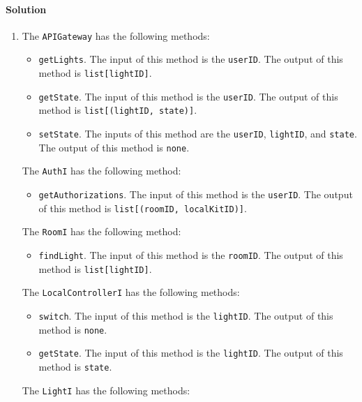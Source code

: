 \paragraph*{Solution}
\begin{enumerate}
    \item The \texttt{APIGateway} has the following methods: 
        \begin{itemize} 
            \item \texttt{getLights}. 
                The input of this method is the \texttt{userID}.
                The output of this method is \texttt{list[lightID]}.
            \item \texttt{getState}.
                The input of this method is the \texttt{userID}.
                The output of this method is \texttt{list[(lightID, state)]}.
            \item \texttt{setState}.
                The inputs of this method are the \texttt{userID}, \texttt{lightID}, and \texttt{state}.
                The output of this method is \texttt{none}.
        \end{itemize}
        The \texttt{AuthI} has the following method: 
        \begin{itemize} 
            \item \texttt{getAuthorizations}. 
                The input of this method is the \texttt{userID}.
                The output of this method is \texttt{list[(roomID, localKitID)]}.
        \end{itemize}
        The \texttt{RoomI} has the following method: 
        \begin{itemize} 
            \item \texttt{findLight}. 
                The input of this method is the \texttt{roomID}.
                The output of this method is \texttt{list[lightID]}.
        \end{itemize}
        The \texttt{LocalControllerI} has the following methods: 
        \begin{itemize} 
            \item \texttt{switch}. 
                The input of this method is the \texttt{lightID}.
                The output of this method is \texttt{none}.
            \item \texttt{getState}. 
                The input of this method is the \texttt{lightID}.
                The output of this method is \texttt{state}.
        \end{itemize}
        The \texttt{LightI} has the following methods: 

\end{enumerate}
